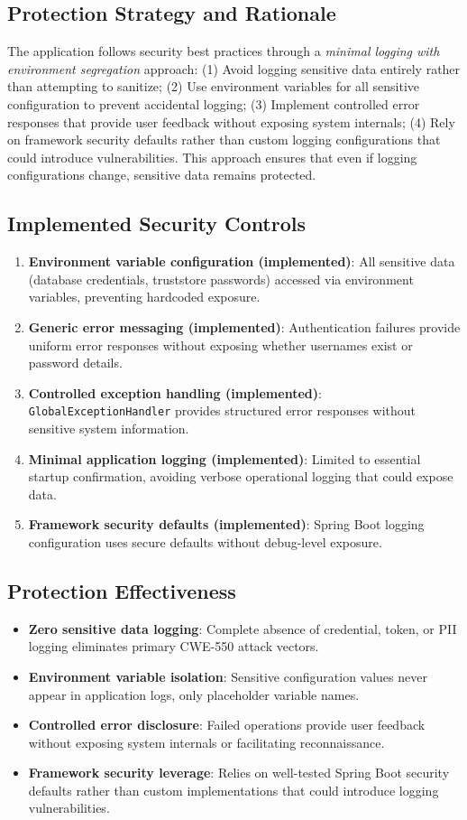 \documentclass[]{UCD_CS_FYP_Report}
\begin{document}
\subsection{Protection Strategy and Rationale}
The application follows security best practices through a \textit{minimal logging with environment segregation} approach: (1) Avoid logging sensitive data entirely rather than attempting to sanitize; (2) Use environment variables for all sensitive configuration to prevent accidental logging; (3) Implement controlled error responses that provide user feedback without exposing system internals; (4) Rely on framework security defaults rather than custom logging configurations that could introduce vulnerabilities. This approach ensures that even if logging configurations change, sensitive data remains protected.

\subsection{Implemented Security Controls}
\begin{enumerate}
	\item \textbf{Environment variable configuration (implemented)}: All sensitive data (database credentials, truststore passwords) accessed via environment variables, preventing hardcoded exposure.
	\item \textbf{Generic error messaging (implemented)}: Authentication failures provide uniform error responses without exposing whether usernames exist or password details.
	\item \textbf{Controlled exception handling (implemented)}: \texttt{GlobalExceptionHandler} provides structured error responses without sensitive system information.
	\item \textbf{Minimal application logging (implemented)}: Limited to essential startup confirmation, avoiding verbose operational logging that could expose data.
	\item \textbf{Framework security defaults (implemented)}: Spring Boot logging configuration uses secure defaults without debug-level exposure.
\end{enumerate}

\subsection{Protection Effectiveness}
\begin{itemize}
	\item \textbf{Zero sensitive data logging}: Complete absence of credential, token, or PII logging eliminates primary CWE-550 attack vectors.
	\item \textbf{Environment variable isolation}: Sensitive configuration values never appear in application logs, only placeholder variable names.
	\item \textbf{Controlled error disclosure}: Failed operations provide user feedback without exposing system internals or facilitating reconnaissance.
	\item \textbf{Framework security leverage}: Relies on well-tested Spring Boot security defaults rather than custom implementations that could introduce logging vulnerabilities.
\end{itemize}
\end{document}
